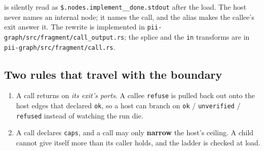is silently read as \texttt{\$.nodes.implement\_\_done.stdout} after the load. The host never names an
internal node; it names the call, and the alias makes the callee's exit answer it. The rewrite is
implemented in \verb|pii-graph/src/fragment/call_output.rs|; the splice and the \texttt{in} transforms
are in \verb|pii-graph/src/fragment/call.rs|.

\begin{center}
\end{center}

\subsection{Two rules that travel with the boundary}

\begin{enumerate}
	\item A call returns on \emph{its exit's ports}. A callee \texttt{refuse} is pulled back out
	onto the host edges that declared \texttt{ok}, so a host can branch on \texttt{ok} /
	\texttt{unverified} / \texttt{refused} instead of watching the run die.
	\item A call declares \texttt{caps}, and a call may only \textbf{narrow} the host's ceiling. A
	child cannot give itself more than its caller holds, and the ladder is checked at load.
\end{enumerate}

